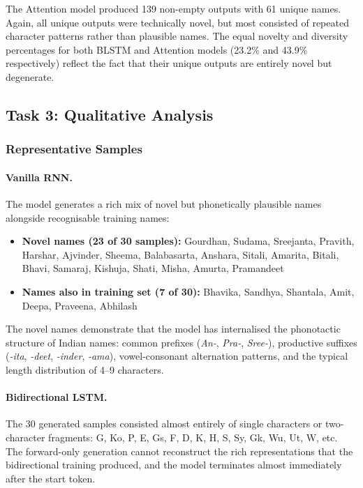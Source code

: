 \documentclass[12pt, a4paper]{article}
\begin{document}
The Attention model produced 139 non-empty outputs with 61 unique names. Again, all unique outputs were technically novel, but most consisted of repeated character patterns rather than plausible names. The equal novelty and diversity percentages for both BLSTM and Attention models (23.2\% and 43.9\% respectively) reflect the fact that their unique outputs are entirely novel but degenerate.

\subsection{Task 3: Qualitative Analysis}

\subsubsection{Representative Samples}

\paragraph{Vanilla RNN.} The model generates a rich mix of novel but phonetically plausible names alongside recognisable training names:

\begin{itemize}[nosep]
  \item \textbf{Novel names (23 of 30 samples):} Gourdhan, Sudama, Sreejanta, Pravith, Harshar, Ajvinder, Sheema, Balabasarta, Anshara, Sitali, Amarita, Bitali, Bhavi, Samaraj, Kishuja, Shati, Misha, Amurta, Pramandeet
  \item \textbf{Names also in training set (7 of 30):} Bhavika, Sandhya, Shantala, Amit, Deepa, Praveena, Abhilash
\end{itemize}

The novel names demonstrate that the model has internalised the phonotactic structure of Indian names: common prefixes (\emph{An-}, \emph{Pra-}, \emph{Sree-}), productive suffixes (\emph{-ita}, \emph{-deet}, \emph{-inder}, \emph{-ama}), vowel-consonant alternation patterns, and the typical length distribution of 4--9 characters.

\paragraph{Bidirectional LSTM.} The 30 generated samples consisted almost entirely of single characters or two-character fragments: G, Ko, P, E, Gs, F, D, K, H, S, Sy, Gk, Wu, Ut, W, etc. The forward-only generation cannot reconstruct the rich representations that the bidirectional training produced, and the model terminates almost immediately after the start token.
\end{document}
